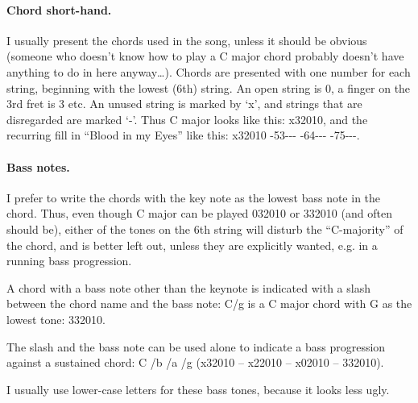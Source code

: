\begin{articlelayout}
\paragraph*{Chord short-hand.} I usually present the chords used in
the song, unless it should be obvious (someone who doesn't know how to
play a C major chord probably doesn't have anything to do in here
anyway\ldots{}). Chords are presented with one number for each string,
beginning with the lowest (6th) string. An open string is 0, a finger
on the 3rd fret is 3 etc. An unused string is marked by `{}x'{}, and
strings that are disregarded are marked `{}-'{}. Thus C major looks
like this: x32010, and the recurring fill in ``{}Blood in my Eyes''{}
like this: x32010 -53{-}-{-} -64{-}-{-} -75{-}-{-}.

\paragraph*{Bass notes.} I prefer to write the chords with the key
note as the lowest bass note in the chord. Thus, even though C major
can be played 032010 or 332010 (and often should be), either of the
tones on the 6th string will disturb the ``{}C-majority''{} of the
chord, and is better left out, unless they are explicitly wanted,
e.g. in a running bass progression.

A chord with a bass note other than the keynote is indicated with a
slash between the chord name and the bass note: C/g is a C major chord
with G as the lowest tone: 332010.

The slash and the bass note can be used alone to indicate a bass
progression against a sustained chord: C /b /a /g (x32010 -- x22010 -- x02010 -- 332010).

I usually use lower-case letters for these bass tones, because it
looks less ugly.


\end{articlelayout}
